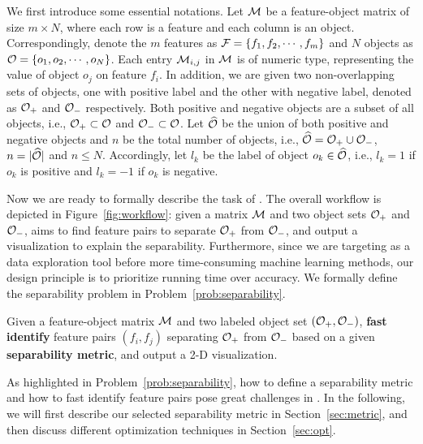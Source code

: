 We first introduce some essential notations. Let $\mm$ be a feature-object matrix of size $m\times N$, where each row is a feature and each column is an object. Correspondingly, denote the $m$ features as $\ff=\{f_1,f_2,\cdots,f_m\}$ and $N$ objects as $\oo=\{o_1,o_2,\cdots,o_N\}$. Each entry $\mm_{i,j}$ in $\mm$ is of numeric type, representing the value of object $o_j$ on feature $f_i$. In addition, we are given two non-overlapping sets of objects, one with positive label and the other with negative label, denoted as $\oo_+$ and $\oo_-$ respectively. Both positive and negative objects are a subset of all objects, i.e., $\oo_+\subset \oo$ and $\oo_-\subset \oo$. Let $\widehat{\oo}$ be the union of both positive and negative objects and $n$ be the total number of objects, i.e., $\widehat{\oo}=\oo_+\cup \oo_-$, $n=|\widehat{\oo}|$ and $n\leq N$. Accordingly, let $l_k$ be the label of object $o_k\in \widehat{\oo}$, i.e., $l_k=1$ if $o_k$ is positive and $l_k=-1$ if $o_k$ is negative. 

Now we are ready to formally describe the task of \genviz. The overall workflow is depicted in Figure~\ref{fig:workflow}: given a matrix $\mm$ and two object sets $\oo_+$ and $\oo_-$, \genviz aims to find feature pairs to separate $\oo_+$ from $\oo_-$, and output a visualization to explain the separability. Furthermore, since we are targeting as a data exploration tool before more time-consuming machine learning methods, our design principle is to prioritize running time over accuracy. We formally define the separability problem in Problem~\ref{prob:separability}. 







\begin{formulation}[Separability]\label{prob:separability}
Given a feature-object matrix $\mm$ and two labeled object set $(\oo_+,\oo_-)$, \textbf{fast identify} \topk feature pairs $(f_i,f_j)$ separating $\oo_+$ from $\oo_-$ based on a given \textbf{separability metric}, and output a 2-D {visualization}.
\end{formulation}


As highlighted in Problem~\ref{prob:separability}, how to define a separability metric and how to fast identify \topk feature pairs pose great challenges in \genviz. In the following, we will first describe our selected separability metric in Section~\ref{sec:metric}, and then discuss different optimization techniques in Section~\ref{sec:opt}.



